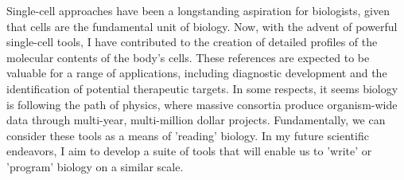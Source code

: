 Single-cell approaches have been a longstanding aspiration for biologists, given that cells are the fundamental unit of biology. Now, with the advent of powerful single-cell tools, I have contributed to the creation of detailed profiles of the molecular contents of the body's cells. These references are expected to be valuable for a range of applications, including diagnostic development and the identification of potential therapeutic targets. In some respects, it seems biology is following the path of physics, where massive consortia produce organism-wide data through multi-year, multi-million dollar projects. Fundamentally, we can consider these tools as a means of 'reading' biology. In my future scientific endeavors, I aim to develop a suite of tools that will enable us to 'write' or 'program' biology on a similar scale\cite{hoose2023dna}.